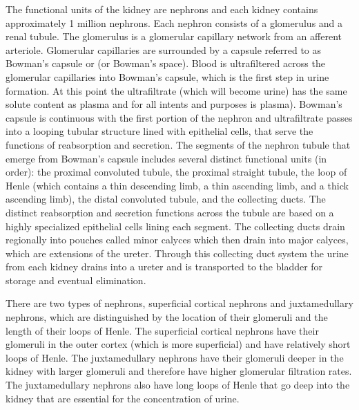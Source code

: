 The functional units of the kidney are nephrons and each kidney contains approximately 1 million nephrons. Each nephron consists of a glomerulus and a renal tubule. The glomerulus is a glomerular capillary network from an afferent arteriole. Glomerular capillaries are surrounded by a capsule referred to as Bowman’s capsule or (or Bowman’s space).  Blood is ultrafiltered across the glomerular capillaries into Bowman’s capsule, which is the first step in urine formation. At this point the ultrafiltrate (which will become urine) has the same solute content as plasma and for all intents and purposes is plasma). Bowman’s capsule is continuous with the first portion of the nephron and ultrafiltrate passes into a looping tubular structure lined with epithelial cells, that serve the functions of reabsorption and secretion. 
The segments of the nephron tubule that emerge from Bowman’s capsule includes several distinct functional units (in order): the proximal convoluted tubule, the proximal straight tubule, the loop of Henle (which contains a thin descending limb, a thin ascending limb, and a thick ascending limb), the distal convoluted tubule, and the collecting ducts. The distinct reabsorption and secretion functions across the tubule are based on a highly specialized epithelial cells lining each segment. The collecting ducts drain regionally into pouches called minor calyces which then drain into major calyces, which are extensions of the ureter. Through this collecting duct system the urine from each kidney drains into a ureter and is transported to the bladder for storage and eventual elimination.

There are two types of nephrons, superficial cortical nephrons and juxtamedullary nephrons, which are distinguished by the location of their glomeruli and the length of their loops of Henle. The superficial cortical nephrons have their glomeruli in the outer cortex (which is more superficial) and have relatively short loops of Henle. The juxtamedullary nephrons have their glomeruli deeper in the kidney with larger glomeruli and therefore have higher glomerular filtration rates. The juxtamedullary nephrons also have long loops of Henle that go deep into the kidney that are essential for the concentration of urine. 

